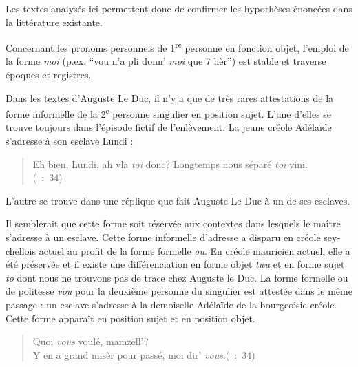 \documentclass[output=paper]{langscibook}
\begin{document}
\begin{otherlanguage}{french}
Les textes analysés ici permettent donc de confirmer les hypothèses énoncées dans la littérature existante.

Concernant les pronoms personnels de 1\textsuperscript{re} personne en fonction objet, l’emploi de la forme \textit{moi} (p.ex. “vou n’a pli donn’ \textit{moi} que 7 hèr”) est stable et traverse époques et registres.

Dans les textes d’Auguste Le Duc, il n’y a que de très rares attestations de la forme informelle de la 2\textsuperscript{e} personne singulier en position sujet. L’une d’elles se trouve toujours dans l’épisode fictif de l’enlèvement. La jeune créole Adélaïde s’adresse à son esclave Lundi :

\begin{quote}
Eh bien, Lundi, ah vla \textit{toi} donc? Longtemps nous séparé \textit{toi} vini.\\\hbox{}\hfill\hbox{(\citealt{Pourcelet1994} : 34)}
\end{quote}

L’autre se trouve dans une réplique que fait Auguste Le Duc à un de ses esclaves. 

Il semblerait que cette forme soit réservée aux contextes dans lesquels le maître s’adresse à un esclave. Cette forme informelle d’adresse a disparu en créole seychellois actuel au profit de la forme formelle \textit{ou}. En créole mauricien actuel, elle a été préservée et il existe une différenciation en forme objet \textit{twa} et en forme sujet \textit{to} dont nous ne trouvons pas de trace chez Auguste le Duc. La forme formelle ou de politesse \textit{vou} pour la deuxième personne du singulier est attestée dans le même passage : un esclave s’adresse à la demoiselle Adélaïde de la bourgeoisie créole. Cette forme apparaît en position sujet et en position objet.

\begin{quote}
Quoi \textit{vous} voulé, mamzell’?\\
Y en a grand misèr pour passé, moi dir’ \textit{vous}.\hbox{}\hfill\hbox{(\citealt{Pourcelet1994} : 34)}
\end{quote}


\end{otherlanguage}
\end{document}
